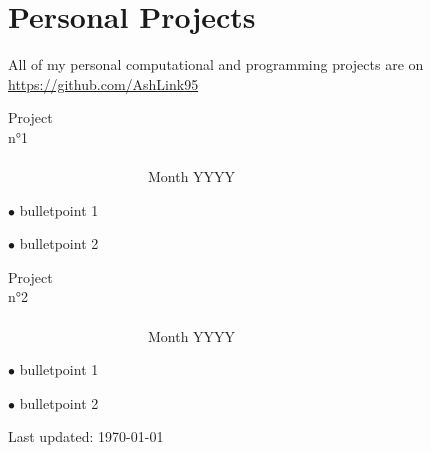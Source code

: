 \documentclass[letterpaper]{article}
\renewenvironment{itemize}{
	\begin{list}{}{
			\setlength{\leftmargin}{1.5em}
		}
	}{
	\end{list}
}
\begin{document}
	\section*{Personal Projects}	%
	{\small All of my personal computational and programming projects are on \href{https://github.com/AshLink95}{https://github.com/AshLink95}}
	\begin{itemize}
		\item Project n°1\ \ \ \ \ \ \ \ \ \ \ \ \ \ \ \ \ \ \ \ \ \ \ \ \ \ \ \ \ \ \ \ \ \ \ \ \ \ \ \ \ \ \ \ \ \ \ \ \ \ \ \ \ \ \ \ \ \ \ \ \ \ \ \ \ \ \ \ \ \ \ \ \ \ \ \ \ \ \ \ \ \ \ \ \ \ \ \ \ \ \ \ \ \ \ \ \ \ \ \ \ \ \ \ \ \ \ \ \ \ \ \ \ \ \ \ \ \ \ \ \ \ \ \ \ \ \ \ \ \ \ \ \ \ \ \ \ \ \ \ \ \ \ \ \ \ \ \ \ \ \ \ \ \ \ \ \ \ \ \ \ Month YYYY
		\begin{itemize} %
			\item $\bullet$ bulletpoint 1

			\item $\bullet$ bulletpoint 2
		\end{itemize}

		\item Project n°2\ \ \ \ \ \ \ \ \ \ \ \ \ \ \ \ \ \ \ \ \ \ \ \ \ \ \ \ \ \ \ \ \ \ \ \ \ \ \ \ \ \ \ \ \ \ \ \ \ \ \ \ \ \ \ \ \ \ \ \ \ \ \ \ \ \ \ \ \ \ \ \ \ \ \ \ \ \ \ \ \ \ \ \ \ \ \ \ \ \ \ \ \ \ \ \ \ \ \ \ \ \ \ \ \ \ \ \ \ \ \ \ \ \ \ \ \ \ \ \ \ \ \ \ \ \ \ \ \ \ \ \ \ \ \ \ \ \ \ \ \ \ \ \ \ \ \ \ \ \ \ \ \ \ \ \ \ \ \ \ \ Month YYYY
		\begin{itemize}
			\item $\bullet$ bulletpoint 1

			\item $\bullet$ bulletpoint 2
		\end{itemize}
	\end{itemize}

	\bigskip

	\begin{center}
		\begin{footnotesize}
			Last updated: \today
		\end{footnotesize}
	\end{center}
\end{document}
